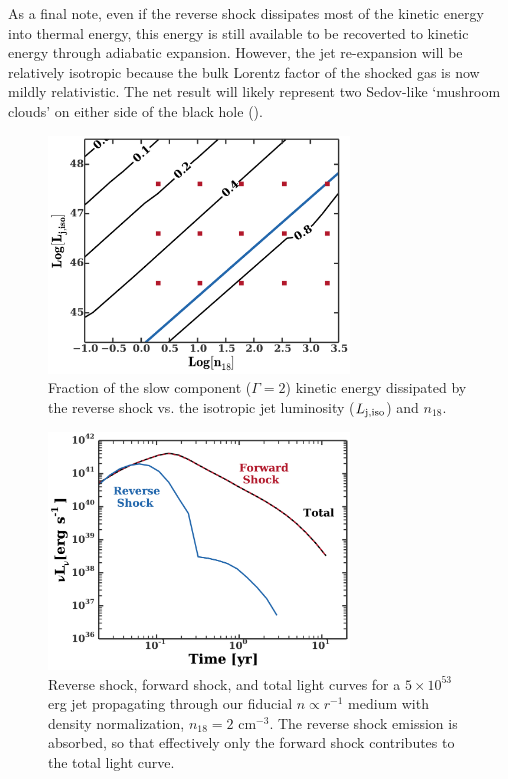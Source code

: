 \documentclass[usenatbib,fleqn]{mnras}
\begin{document}
As a final note, even if the reverse shock dissipates most of the
kinetic energy into thermal energy, this energy is still available to
be recoverted to kinetic energy through adiabatic expansion.  However,
the jet re-expansion will be relatively isotropic because the bulk
Lorentz factor of the shocked gas is now mildly relativistic.  The net
result will likely represent two Sedov-like `mushroom clouds' on
either side of the black hole (\citealt{Giannios&Metzger2011}).


\begin{figure}
\includegraphics[width=8cm]{diss.pdf}
\caption{\label{fig:diss} Fraction of the slow component
  ($\Gamma=2$) kinetic energy dissipated by the reverse shock
  vs. the isotropic jet luminosity ($L_{\rm j,iso}$) and $n_{18}$.}
\end{figure}

\begin{figure}
  \includegraphics[width=8cm]{reverse.pdf}
  \caption{\label{fig:reverse} Reverse shock, forward shock, and total
    light curves for a $5\times 10^{53}$ erg jet propagating through
    our fiducial $n\propto r^{-1}$ medium with density normalization,
    $n_{18}=2$ cm$^{-3}$. The reverse shock emission is absorbed, so
    that effectively only the forward shock contributes to the total
    light curve.}
\end{figure}
\end{document}
